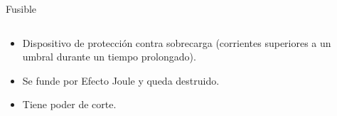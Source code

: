 \documentclass[xcolor={usenames,svgnames,dvipsnames}]{beamer}
\begin{document}
\begin{frame}[label={sec:org2721c6c}]{Fusible}
\begin{columns}
\begin{column}{0.7\columnwidth}
\begin{itemize}
\item Dispositivo de protección contra sobrecarga (corrientes superiores a un umbral durante un tiempo prolongado).

\item Se funde por Efecto Joule y queda destruido.

\item Tiene poder de corte.
\end{itemize}
\end{column}
\begin{column}{0.3\columnwidth}
\begin{center}

\end{center}
\end{column}
\end{columns}
\end{frame}
\end{document}
